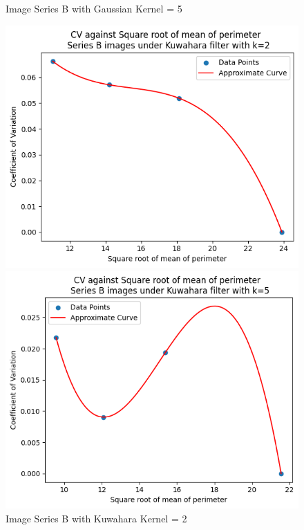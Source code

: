 \documentclass[runningheads]{llncs}
\begin{document}
\begin{figure}[h!]
\begin{minipage}[h]{0.47\linewidth}
\begin{center}
\caption{Image Series B with Gaussian Kernel = 5}
\label{SeriesB-Gaussian-Kernel5-PerimeterGraph}
\end{center}
\end{minipage}
\vfill
\vspace{0.2 cm}
\begin{minipage}[h]{0.47\linewidth}
\begin{center}
\includegraphics[width=1\linewidth]{Report/Result_Images/series_B_Kuwahara_kernel_2_perimeter.png} 
\caption{Image Series B with Kuwahara Kernel = 2}
\label{SeriesB-Kuwahara-Kernel2-PerimeterGraph}
\end{center}
\end{minipage}
\hfill
\begin{minipage}[h]{0.47\linewidth}
\begin{center}
\includegraphics[width=1\linewidth]{Report/Result_Images/series_B_Kuwahara_kernel_5_perimeter.png} 

\end{center}
\end{minipage}
\end{figure}
\end{document}
